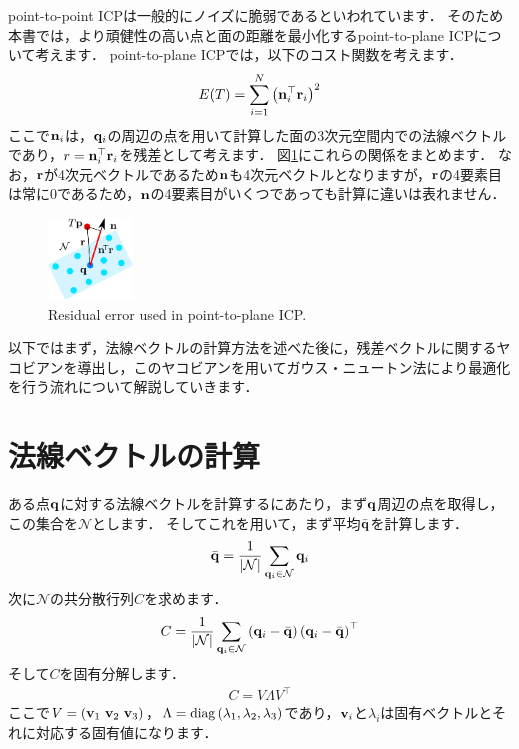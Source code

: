 point-to-point ICPは一般的にノイズに脆弱であるといわれています．
そのため本書では，より頑健性の高い点と面の距離を最小化するpoint-to-plane ICPについて考えます．
point-to-plane ICPでは，以下のコスト関数を考えます．
%
\begin{align}
  E(T) = \sum_{i=1}^{N} \left( {\bf n}_{i}^{\top} {\bf r}_{i} \right)^{2}
  \label{eq:point-to-plane_icp_cost_SE(3)}
\end{align}
%
ここで${\bf n}_{i}$は，${\bf q}_{i}$の周辺の点を用いて計算した面の3次元空間内での法線ベクトルであり，$r = {\bf n}_{i}^{\top} {\bf r}_{i}$を残差として考えます．
図\ref{fig:normal_residual}にこれらの関係をまとめます．
なお，${\bf r}$が4次元ベクトルであるため${\bf n}$も4次元ベクトルとなりますが，${\bf r}$の4要素目は常に0であるため，${\bf n}$の4要素目がいくつであっても計算に違いは表れません．

\begin{figure}[!t]
  \centering
  \includegraphics[width=0.2\textwidth]{../figs/normal_residual.pdf}
  \caption{Residual error used in point-to-plane ICP.}
  \label{fig:normal_residual}
\end{figure}

以下ではまず，法線ベクトルの計算方法を述べた後に，残差ベクトルに関するヤコビアンを導出し，このヤコビアンを用いてガウス・ニュートン法により最適化を行う流れについて解説していきます．










\section{法線ベクトルの計算}

ある点${\bf q}$に対する法線ベクトルを計算するにあたり，まず${\bf q}$周辺の点を取得し，この集合を$\mathcal{N}$とします．
そしてこれを用いて，まず平均$\bar{ {\bf q} }$を計算します．
%
\begin{align}
  \bar{ {\bf q} } = \frac{1}{ | \mathcal{N} | } \sum_{ {\bf q}_{i} \in \mathcal{N} } {\bf q}_{i}
  \label{eq:points_mean}
\end{align}
%
次に$\mathcal{N}$の共分散行列$C$を求めます．
%
\begin{align}
  C = \frac{1}{ | \mathcal{N} | } \sum_{ {\bf q}_{i} \in \mathcal{N} } \left( {\bf q}_{i} - \bar{ {\bf q} } \right) \left( {\bf q}_{i} - \bar{ {\bf q} } \right)^{\top}
  \label{eq:points_covariance}
\end{align}
%
そして$C$を固有分解します．
%
\begin{align}
  C = V \Lambda V^{\top}
\end{align}
%
ここで$V = \left( {\bf v}_{1} ~ {\bf v}_{2} ~ {\bf v}_{3} \right)$，$\Lambda = {\rm diag} \left( \lambda_{1}, \lambda_{2}, \lambda_{3} \right)$であり，${\bf v}_{i}$と$\lambda_{i}$は固有ベクトルとそれに対応する固有値になります．


